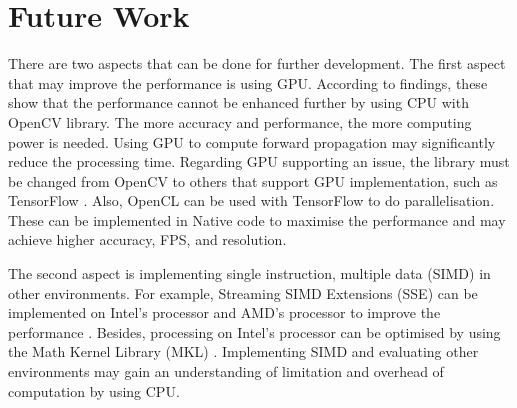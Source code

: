     \section{Future Work}
    There are two aspects that can be done for further development.
    The first aspect that may improve the performance is using GPU.
        According to findings, these show that the performance cannot be enhanced further by using CPU with OpenCV library.
        The more accuracy and performance, the more computing power is needed.
        Using GPU to compute forward propagation may significantly reduce the processing time.
        Regarding GPU supporting an issue, the library must be changed from OpenCV to others that support
        GPU implementation, such as TensorFlow \cite{tensorflow2015-whitepaper}.
        Also, OpenCL can be used with TensorFlow to do parallelisation.
        These can be implemented in Native code to maximise the performance
        and may achieve higher accuracy, FPS, and resolution.

    The second aspect is implementing single instruction, multiple data (SIMD) in other environments.
        For example, Streaming SIMD Extensions (SSE) can be implemented on Intel's processor and AMD's processor to improve the performance \cite{intel-sse}.
        Besides, processing on Intel's processor can be optimised by using the Math Kernel Library (MKL) \cite{intel-alt}.
       Implementing SIMD and evaluating other environments may gain an understanding of limitation and overhead of computation by using CPU.